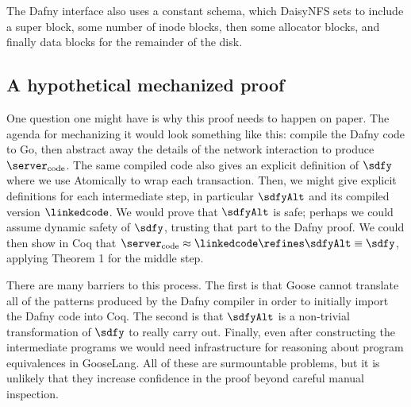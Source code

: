 The Dafny interface also
uses a constant schema, which DaisyNFS sets to include a super block, some
number of inode blocks, then some allocator blocks, and finally data blocks
for the remainder of the disk.

\subsection{A hypothetical mechanized proof}

One question one might have is why this proof needs to happen on paper. The
agenda for mechanizing it would look something like this: compile the Dafny code
to Go, then abstract away the details of the network interaction to produce
$\server_{\mathrm{code}}$. The same compiled code also gives an explicit
definition of $\sdfy$ where we use Atomically to wrap each transaction. Then, we
might give explicit definitions for each intermediate step, in particular
$\sdfyAlt$ and its compiled version $\linkedcode$. We would prove that
$\sdfyAlt$ is safe; perhaps we could assume dynamic safety of $\sdfy$, trusting
that part to the Dafny proof. We could then show in Coq that
$\server_{\mathrm{code}} \approx \linkedcode \refines \sdfyAlt \equiv \sdfy$,
applying Theorem 1 for the middle step.

There are many barriers to this process. The first is that Goose cannot
translate all of the patterns produced by the Dafny compiler in order to
initially import the Dafny code into Coq. The second is that $\sdfyAlt$ is a
non-trivial transformation of $\sdfy$ to really carry out. Finally, even after
constructing the intermediate programs we would need infrastructure for
reasoning about program equivalences in GooseLang. All of these are surmountable
problems, but it is unlikely that they increase confidence in the proof beyond
careful manual inspection.
